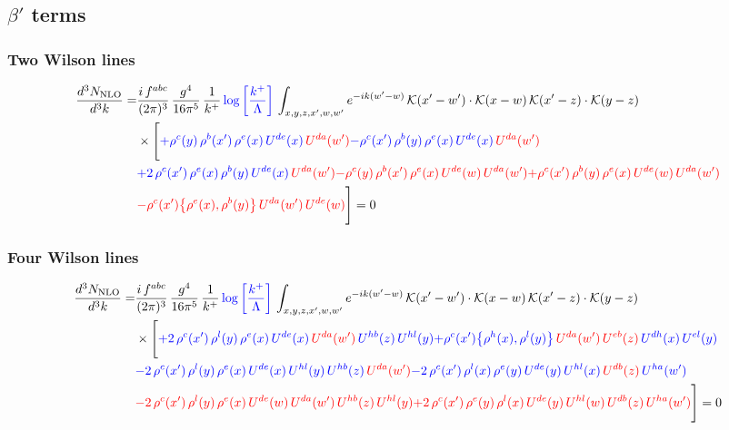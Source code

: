 \documentclass[9pt]{article}
\numberwithin{equation}{section}
\begin{document}
\subsection{$\beta'$ terms}
\subsubsection{Two Wilson lines}
\begin{align}
    \frac{d^{3}N_{\rm NLO}}{d^{3}k}= & \frac{i\,f^{abc}}{(2\pi)^{3}}\,\frac{g^{4}}{16\pi^{5}}\,\frac{1}{k^{+}}\,{\color{blue}\log{\left[\frac{k^{+}}{\Lambda}\right]}}\,\int_{x,y,z,x',w,w'}e^{-ik(w'-w)}\,\mathcal{K}(x'-w')\cdot\mathcal{K}(x-w)\,\mathcal{K}(x'-z)\cdot\mathcal{K}(y-z)\notag \\ & \times\Bigg[{\color{blue}+\rho^{c}(y)\,\rho^{b}(x')\,\rho^{e}(x)\,U^{de}(x)\,{\color{red}U^{da}(w')}}{\color{blue}-\rho^{c}(x')\,\rho^{b}(y)\,\rho^{e}(x)\,U^{de}(x)\,{\color{red}U^{da}(w')}}\notag \\ & {\color{blue}+2\,\rho^{c}(x')\,\rho^{e}(x)\,\rho^{b}(y)\,U^{de}(x)\,{\color{red}U^{da}(w')}}{\color{red}-\rho^{c}(y)\,\rho^{b}(x')\,\rho^{e}(x)\,U^{de}(w)\,{\color{red}U^{da}(w')}}{\color{red}+\rho^{c}(x')\,\rho^{b}(y)\,\rho^{e}(x)\,U^{de}(w)\,{\color{red}U^{da}(w')}}\notag \\ & {\color{red} -\rho^{c}(x')\big\{\rho^{e}(x),\rho^{b}(y)\big\}\,{\color{red}U^{da}(w')}\,U^{de}(w)}\Bigg] = 0 
\end{align}    
\subsubsection{Four Wilson lines}
\begin{align}
    \frac{d^{3}N_{\rm NLO}}{d^{3}k}= & \frac{i\,f^{abc}}{(2\pi)^{3}}\,\frac{g^{4}}{16\pi^{5}}\,\frac{1}{k^{+}}\,{\color{blue}\log{\left[\frac{k^{+}}{\Lambda}\right]}}\,\int_{x,y,z,x',w,w'}e^{-ik(w'-w)}\,\mathcal{K}(x'-w')\cdot\mathcal{K}(x-w)\,\mathcal{K}(x'-z)\cdot\mathcal{K}(y-z)\notag \\ & \times\Bigg[{\color{blue}+2\,\rho^{c}(x')\,\rho^{l}(y)\,\rho^{e}(x)\,U^{de}(x)\,{\color{red}U^{da}(w')}\,U^{hb}(z)\,U^{hl}(y)}{\color{blue}+\rho^{c}(x')\big\{\rho^{h}(x),\rho^{l}(y)\big\}\,{\color{red}U^{da}(w')}\,{\color{red}U^{eb}(z)}\,U^{dh}(x)\,U^{el}(y)}\notag \\ & {\color{blue}-2\,\rho^{c}(x')\,\rho^{l}(y)\,\rho^{e}(x)\,U^{de}(x)\,U^{hl}(y)\,U^{hb}(z)\,{\color{red}U^{da}(w')}}{\color{blue}-2\,\rho^{c}(x')\,\rho^{l}(x)\,\rho^{e}(y)\,U^{de}(y)\,U^{hl}(x)\,{\color{red}U^{db}(z)}\,U^{ha}(w')}\notag \\ & {\color{red}-2\,\rho^{c}(x')\,\rho^{l}(y)\,\rho^{e}(x)\,U^{de}(w)\,{\color{red}U^{da}(w')}\,U^{hb}(z)\,U^{hl}(y)}{\color{red}+2\,\rho^{c}(x')\,\rho^{e}(y)\,\rho^{l}(x)\,U^{de}(y)\,U^{hl}(w)\,U^{db}(z)\,U^{ha}(w')}\Bigg] = 0
\end{align}
\end{document}
